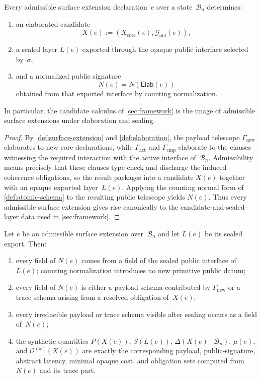 \documentclass{lmcs}
\newcommand{\B}{\mathcal{B}}
\newcommand{\Ocal}{\mathcal{O}}
\newcommand{\Gcal}{\mathcal{G}}
\begin{document}
\begin{thm}
\label{thm:elaboration}
Every admissible surface extension declaration~$e$ over a state~$\B_n$ determines:
\begin{enumerate}
  \item an elaborated candidate
  \[
    X(e) := (X_{\mathrm{core}}(e), \Gcal_{\mathrm{obl}}(e)),
  \]
  \item a sealed layer $L(e)$ exported through the opaque public interface selected by~$\sigma$,
  \item and a normalized public signature
  \[
    N(e) = N(\mathsf{Elab}(e))
  \]
  obtained from that exported interface by counting normalization.
\end{enumerate}
In particular, the candidate calculus of \autoref{sec:framework} is the image of admissible surface extensions under elaboration and sealing.
\end{thm}

\begin{proof}
By \autoref{def:surface-extension} and \autoref{def:elaboration}, the payload telescope $\Gamma_{\mathrm{new}}$ elaborates to new core declarations, while $\Gamma_{\mathrm{act}}$ and $\Gamma_{\mathrm{cmp}}$ elaborate to the clauses witnessing the required interaction with the active interface of~$\B_n$. Admissibility means precisely that these clauses type-check and discharge the induced coherence obligations, so the result packages into a candidate $X(e)$ together with an opaque exported layer~$L(e)$. Applying the counting normal form of \autoref{def:atomic-schema} to the resulting public telescope yields $N(e)$. Thus every admissible surface extension gives rise canonically to the candidate-and-sealed-layer data used in \autoref{sec:framework}.
\end{proof}

\begin{thm}
\label{thm:adequacy}
Let $e$ be an admissible surface extension over~$\B_n$ and let $L(e)$ be its sealed export. Then:
\begin{enumerate}
  \item every field of $N(e)$ comes from a field of the sealed public interface of~$L(e)$; counting normalization introduces no new primitive public datum;
  \item every field of $N(e)$ is either a payload schema contributed by $\Gamma_{\mathrm{new}}$ or a trace schema arising from a resolved obligation of~$X(e)$;
  \item every irreducible payload or trace schema visible after sealing occurs as a field of~$N(e)$;
  \item the synthetic quantities $P(X(e))$, $S(L(e))$, $\Delta(X(e)\mid\B_n)$, $\mu(e)$, and $\Ocal^{(k)}(X(e))$ are exactly the corresponding payload, public-signature, abstract latency, minimal opaque cost, and obligation sets computed from~$N(e)$ and its trace part.
\end{enumerate}
\end{thm}
\end{document}
